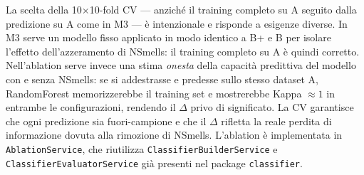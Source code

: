 La scelta della 10$\times$10-fold CV --- anziché il training completo su A seguito dalla
predizione su A come in M3 --- è intenzionale e risponde a esigenze diverse. In M3 serve
un modello fisso applicato in modo identico a B+ e B per isolare l'effetto dell'azzeramento
di NSmells: il training completo su A è quindi corretto. Nell'ablation serve invece una
stima \textit{onesta} della capacità predittiva del modello con e senza NSmells: se si
addestrasse e predesse sullo stesso dataset A, RandomForest memorizzerebbe il training set
e mostrerebbe Kappa $\approx 1$ in entrambe le configurazioni, rendendo il $\Delta$
privo di significato. La CV garantisce che ogni predizione sia fuori-campione e che il $\Delta$
rifletta la reale perdita di informazione dovuta alla rimozione di NSmells.
L'ablation è implementata in \texttt{AblationService}, che riutilizza
\texttt{ClassifierBuilderService} e \texttt{ClassifierEvaluatorService} già presenti nel
package \texttt{classifier}.
